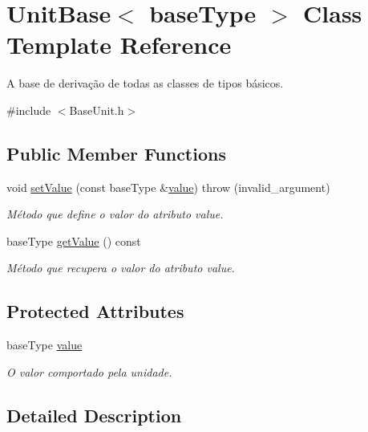 \hypertarget{classUnitBase}{\section{Unit\-Base$<$ base\-Type $>$ Class Template Reference}
\label{d5/db5/classUnitBase}
}


A base de derivação de todas as classes de tipos básicos.  




{\ttfamily \#include $<$Base\-Unit.\-h$>$}

\subsection*{Public Member Functions}
\begin{DoxyCompactItemize}
\item 
void \hyperlink{classUnitBase_af14e2453bc9870f0e04514799585e763}{set\-Value} (const base\-Type \&\hyperlink{classUnitBase_a1c1ad08b45f07a94e5cf71dee734436b}{value})  throw (invalid\-\_\-argument)
\begin{DoxyCompactList}\small\item\em Método que define o valor do atributo value. \end{DoxyCompactList}\item 
base\-Type \hyperlink{classUnitBase_a6b4041c7176acb6c4956e085603449d1}{get\-Value} () const 
\begin{DoxyCompactList}\small\item\em Método que recupera o valor do atributo value. \end{DoxyCompactList}\end{DoxyCompactItemize}
\subsection*{Protected Attributes}
\begin{DoxyCompactItemize}
\item 
base\-Type \hyperlink{classUnitBase_a1c1ad08b45f07a94e5cf71dee734436b}{value}
\begin{DoxyCompactList}\small\item\em O valor comportado pela unidade. \end{DoxyCompactList}\end{DoxyCompactItemize}


\subsection{Detailed Description}
